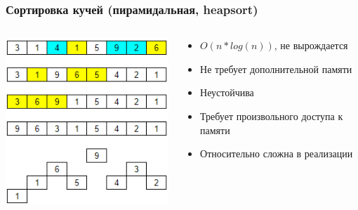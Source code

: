 \documentclass[xetex,mathserif,serif]{beamer}
\begin{document}
	\begin{frame}
		\frametitle{Сортировка кучей (пирамидальная, heapsort)}
		\begin{columns}
			\begin{column}{0.4\textwidth}
				\includegraphics[width=\textwidth]{heapsortHeapConstruction.png}
			\end{column}
			\begin{column}{0.6\textwidth}
				\begin{itemize}
					\item $O(n * log(n))$, не вырождается
					\item Не требует дополнительной памяти
					\item Неустойчива
					\item Требует произвольного доступа к памяти
					\item Относительно сложна в реализации
				\end{itemize}
			\end{column}
		\end{columns}
	\end{frame}
\end{document}
